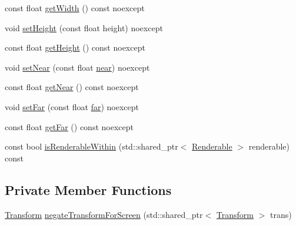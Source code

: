 \begin{DoxyCompactItemize}
\item 
const float \hyperlink{class_graphics_1_1_camera_a3ad408f656300f71c96e426dd6a2229e}{get\+Width} () const noexcept
\item 
void \hyperlink{class_graphics_1_1_camera_ae99d2724d10610bda819b50d6caebc3b}{set\+Height} (const float height) noexcept
\item 
const float \hyperlink{class_graphics_1_1_camera_af74120d1b11dae8e05bfa36e14019a06}{get\+Height} () const noexcept
\item 
void \hyperlink{class_graphics_1_1_camera_a7c4ae1ab7d2193b474b0f21f7520048e}{set\+Near} (const float \hyperlink{class_graphics_1_1_camera_ad4c61e1382447826985b5a5445379375}{near}) noexcept
\item 
const float \hyperlink{class_graphics_1_1_camera_abb26f99ab2483da3ba991608fac0be78}{get\+Near} () const noexcept
\item 
void \hyperlink{class_graphics_1_1_camera_a28bcc186295608ede40f37950d2de4e3}{set\+Far} (const float \hyperlink{class_graphics_1_1_camera_a1d6d4c2d74d4d25ef66900bf603e88af}{far}) noexcept
\item 
const float \hyperlink{class_graphics_1_1_camera_a619c02f188c7eea0edefacdda440dff7}{get\+Far} () const noexcept
\item 
const bool \hyperlink{class_graphics_1_1_camera_a9a4015f5d7e54c8bf2ba248f72951578}{is\+Renderable\+Within} (std\+::shared\+\_\+ptr$<$ \hyperlink{class_graphics_1_1_renderable}{Renderable} $>$ renderable) const 
\end{DoxyCompactItemize}
\subsection*{Private Member Functions}
\begin{DoxyCompactItemize}
\item 
\hyperlink{class_transform}{Transform} \hyperlink{class_graphics_1_1_camera_a5a828597ad4c4534481db66c38900cf0}{negate\+Transform\+For\+Screen} (std\+::shared\+\_\+ptr$<$ \hyperlink{class_transform}{Transform} $>$ trans)
\end{DoxyCompactItemize}
